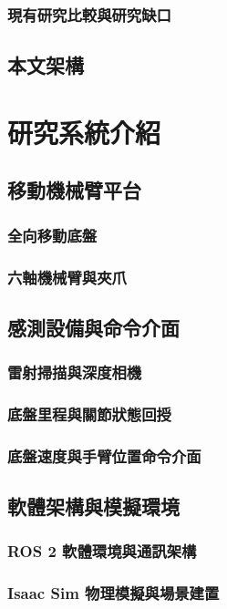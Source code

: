\subsection{現有研究比較與研究缺口}

\section{本文架構}

\chapter{研究系統介紹}

\section{移動機械臂平台}
\subsection{全向移動底盤}
\subsection{六軸機械臂與夾爪}
\section{感測設備與命令介面}
\subsection{雷射掃描與深度相機}
\subsection{底盤里程與關節狀態回授}
\subsection{底盤速度與手臂位置命令介面}

\section{軟體架構與模擬環境}
\subsection{ROS 2 軟體環境與通訊架構}
\subsection{Isaac Sim 物理模擬與場景建置}
